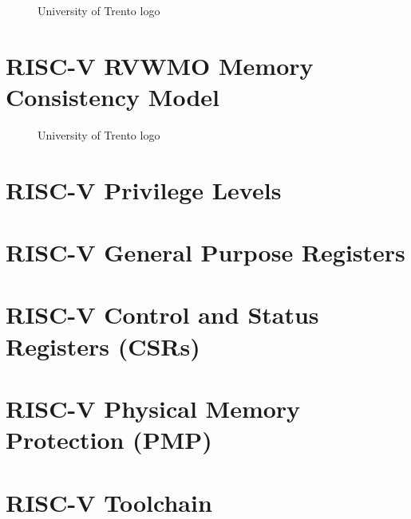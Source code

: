\begin{figure}[htbp]
  \centering
  \def\stackalignment{r} %
  {\scriptsize }
  \caption{University of Trento logo}
  \label{fig:instrumentation}
\end{figure}

\section{RISC-V RVWMO Memory Consistency Model}
\label{sec:riscv_rvwmo}

\lipsum[1]

\begin{figure}[htbp]
  \centering
  \def\stackalignment{r} %
  {\scriptsize }
  \caption{University of Trento logo}
  \label{fig:functioning}
\end{figure}

\section{RISC-V Privilege Levels}
\label{sec:riscv_privileges}

\lipsum[1]

\section{RISC-V General Purpose Registers}
\label{sec:riscv_reg}

\lipsum[1]

\section{RISC-V Control and Status Registers (CSRs)}
\label{sec:riscv_csrs}

\lipsum[1]

\section{RISC-V Physical Memory Protection (PMP)}
\label{sec:riscv_pmp}

\lipsum[1]

\section{RISC-V Toolchain}
\label{sec:riscv_toolchain}

\lipsum[1]
